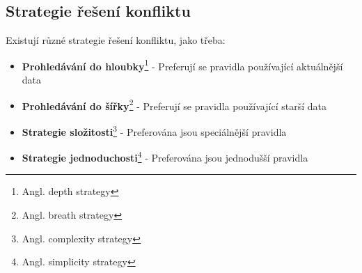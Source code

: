 \documentclass{article}
\begin{document}
\subsection*{Strategie řešení konfliktu}
	
Existují různé strategie řešení konfliktu, jako třeba:

\begin{itemize}

\item \textbf{Prohledávání do hloubky}\footnote{Angl. depth strategy} - Preferují se pravidla používající aktuálnější data

\item \textbf{Prohledávání do šířky}\footnote{Angl. breath strategy} - Preferují se pravidla používající starší data

\item \textbf{Strategie složitosti}\footnote{Angl. complexity strategy} - Preferována jsou speciálnější pravidla

\item \textbf{Strategie jednoduchosti}\footnote{Angl. simplicity strategy} - Preferována jsou jednodušší pravidla

\end{itemize}
\end{document}

